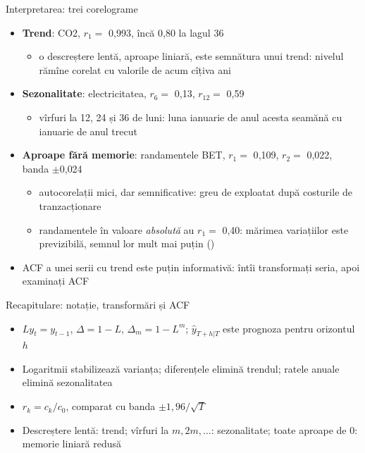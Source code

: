 \begin{frame}{Interpretarea: trei corelograme}
\itemsize{\small}
\begin{itemize}
    \item \textbf{Trend}: CO2, $r_1 = $ 0{,}993, încă 0{,}80 la lagul 36
    \begin{itemize}
        \item o descreștere lentă, aproape liniară, este semnătura unui trend: nivelul rămîne corelat cu valorile de acum cîțiva ani
    \end{itemize}
    \item \textbf{Sezonalitate}: electricitatea, $r_6 = $ 0{,}13, $r_{12} = $ 0{,}59
    \begin{itemize}
        \item vîrfuri la 12, 24 și 36 de luni: luna ianuarie de anul acesta seamănă cu ianuarie de anul trecut
    \end{itemize}
    \item \textbf{Aproape fără memorie}: randamentele BET, $r_1 = $ 0{,}109, $r_2 = $ 0{,}022, banda $\pm$0{,}024
    \begin{itemize}
        \item autocorelații mici, dar semnificative: greu de exploatat după costurile de tranzacționare
        \item randamentele în valoare \emph{absolută} au $r_1 = $ 0{,}40: mărimea variațiilor este previzibilă, semnul lor mult mai puțin ()
    \end{itemize}
    \item ACF a unei serii cu trend este puțin informativă: întîi transformați seria, apoi examinați ACF
\end{itemize}
\end{frame}

\begin{frame}{Recapitulare: notație, transformări și ACF}
\itemsize{\small}
\begin{itemize}
    \item $L y_t = y_{t-1}$, $\Delta = 1 - L$, $\Delta_m = 1 - L^m$; $\hat y_{T+h|T}$ este prognoza pentru orizontul $h$
    \item Logaritmii stabilizează varianța; diferențele elimină trendul; ratele anuale elimină sezonalitatea
    \item $r_k = c_k / c_0$, comparat cu banda $\pm 1{,}96/\sqrt T$
    \item Descreștere lentă: trend; vîrfuri la $m, 2m, \ldots$: sezonalitate; toate aproape de 0: memorie liniară redusă
\end{itemize}
\end{frame}


